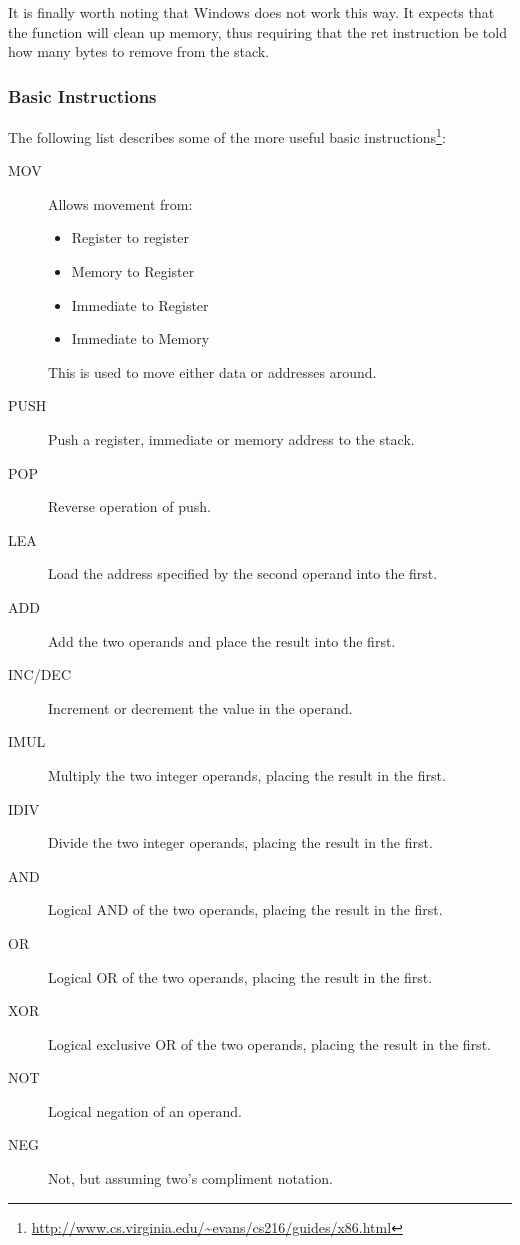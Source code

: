 				It is finally worth noting that Windows does not work this way.
				It expects that the function will clean up memory, thus requiring that the ret instruction be told how many bytes to remove from the stack.

			\subsubsection{Basic Instructions}
				The following list describes some of the more useful basic instructions\footnote{\url{http://www.cs.virginia.edu/~evans/cs216/guides/x86.html}}:
				\begin{description}
					\item[MOV] Allows movement from:
						\begin{itemize}
							\item Register to register
							\item Memory to Register
							\item Immediate to Register
							\item Immediate to Memory
						\end{itemize}
						This is used to move either data or addresses around.
					\item[PUSH] Push a register, immediate or memory address to the stack.
					\item[POP] Reverse operation of push.
					\item[LEA] Load the address specified by the second operand into the first.
					\item[ADD] Add the two operands and place the result into the first.
					\item[INC/DEC] Increment or decrement the value in the operand.
					\item[IMUL] Multiply the two integer operands, placing the result in the first.
					\item[IDIV] Divide the two integer operands, placing the result in the first.
					\item[AND] Logical AND of the two operands, placing the result in the first.
					\item[OR] Logical OR of the two operands, placing the result in the first.
					\item[XOR] Logical exclusive OR of the two operands, placing the result in the first.
					\item[NOT] Logical negation of an operand.
					\item[NEG] Not, but assuming two's compliment notation.

\end{description}
